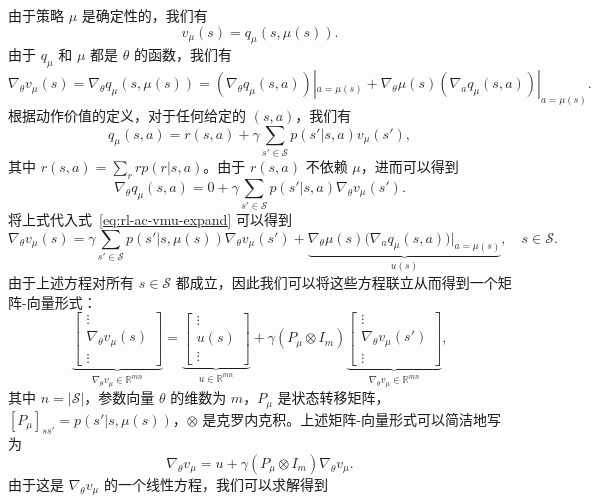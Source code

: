 \begin{derivation}\label{box:rl-ac-lemma-proof}
由于策略 $\mu$ 是确定性的，我们有
\[
v_{\mu}(s) = q_{\mu}(s, \mu(s)).
\]
由于 $q_{\mu}$ 和 $\mu$ 都是 $\theta$ 的函数，我们有
\begin{equation}
\nabla_{\theta} v_{\mu}(s) = \nabla_{\theta} q_{\mu}(s, \mu(s)) = (\nabla_{\theta} q_{\mu}(s, a)) |_{a = \mu(s)} + \nabla_{\theta} \mu(s) (\nabla_{a} q_{\mu}(s, a)) |_{a = \mu(s)}.
\label{eq:rl-ac-vmu-expand}
\end{equation}
根据动作价值的定义，对于任何给定的 $(s, a)$，我们有
\[
q_{\mu}(s, a) = r(s, a) + \gamma \sum_{s' \in \mathcal{S}} p(s' | s, a) v_{\mu}(s'),
\]
其中 $r(s, a) = \sum_{r} r p(r | s, a)$。由于 $r(s, a)$ 不依赖 $\mu$，进而可以得到
\[
\nabla_{\theta} q_{\mu}(s, a) = 0 + \gamma \sum_{s' \in \mathcal{S}} p(s' | s, a) \nabla_{\theta} v_{\mu}(s').
\]
将上式代入式~\eqref{eq:rl-ac-vmu-expand} 可以得到
\[
\nabla_{\theta} v_{\mu}(s) = \gamma \sum_{s' \in \mathcal{S}} p(s' | s, \mu(s)) \nabla_{\theta} v_{\mu}(s') + \underbrace{\nabla_{\theta} \mu(s) \big( \nabla_{a} q_{\mu}(s, a) \big) |_{a = \mu(s)}}_{u(s)}, \quad s \in \mathcal{S}.
\]
由于上述方程对所有 $s \in \mathcal{S}$ 都成立，因此我们可以将这些方程联立从而得到一个矩阵-向量形式：
\[
\underbrace{\left[ \begin{array}{c} \vdots \\ \nabla_{\theta} v_{\mu}(s) \\ \vdots \end{array} \right]}_{\nabla_{\theta} v_{\mu} \in \mathbb{R}^{mn}}
= \underbrace{\left[ \begin{array}{c} \vdots \\ u(s) \\ \vdots \end{array} \right]}_{u \in \mathbb{R}^{mn}}
+ \gamma (P_{\mu} \otimes I_{m}) \underbrace{\left[ \begin{array}{c} \vdots \\ \nabla_{\theta} v_{\mu}(s') \\ \vdots \end{array} \right]}_{\nabla_{\theta} v_{\mu} \in \mathbb{R}^{mn}},
\]
其中 $n = |\mathcal{S}|$，参数向量 $\theta$ 的维数为 $m$，$P_{\mu}$ 是状态转移矩阵，$[P_{\mu}]_{ss'} = p(s' | s, \mu(s))$，$\otimes$ 是克罗内克积。上述矩阵-向量形式可以简洁地写为
\[
\nabla_{\theta} v_{\mu} = u + \gamma (P_{\mu} \otimes I_{m}) \nabla_{\theta} v_{\mu}.
\]
由于这是 $\nabla_{\theta} v_{\mu}$ 的一个线性方程，我们可以求解得到
\begin{equation}

\end{equation}
\end{derivation}
